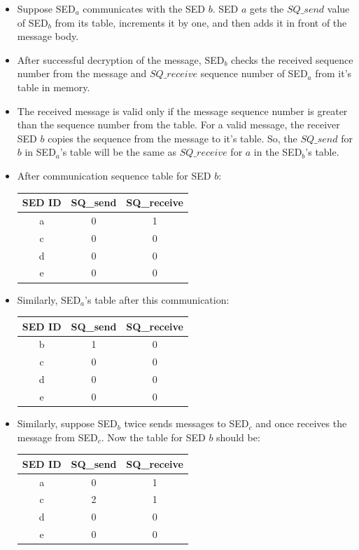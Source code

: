 \documentclass[11pt,oneside,onecolumn,letterpaper]{article}
\begin{document}
\begin{itemize}
  \item Suppose SED$_a$ communicates with the SED $b$. SED $a$ gets the 
   $SQ\_send$ value of SED$_b$ from its table, increments it by one, and then adds it in front of the message body. 
  \item After successful decryption of the message, SED$_b$ checks the received sequence number from the message and $SQ\_receive$ sequence number of SED$_a$ from it's table in memory.
  \item The received message is valid only if the message sequence number is greater than the sequence number from the table. For a valid message, the receiver SED $b$ copies the sequence from the message to it's table. So, the  $SQ\_send$ for $b$ in SED$_a$'s table will be the same as $SQ\_receive$ for $a$ in the SED$_b$'s table.
  \item After communication sequence table for SED $b$:
    \begin{center}
  \begin{tabular}{ |c|c|c| } 
   \hline
  \textbf{SED ID} & \textbf{SQ\_send} & \textbf{SQ\_receive}\\
 	\hline \hline
 	a & 0 & 1 \\ 
	c & 0 & 0 \\ 
 	d & 0 & 0 \\ 
 	e & 0 & 0 \\ 
	 \hline
\end{tabular}
\end{center}
\item Similarly, SED$_a$'s table after this communication:
    \begin{center}
  \begin{tabular}{ |c|c|c| } 
   \hline
  \textbf{SED ID} & \textbf{SQ\_send} & \textbf{SQ\_receive}\\
 	\hline \hline
 	b & 1 & 0 \\ 
	c & 0 & 0 \\ 
 	d & 0 & 0 \\ 
 	e & 0 & 0 \\ 
	 \hline
\end{tabular}
\end{center}
\item Similarly, suppose SED$_b$ twice sends messages to SED$_c$ and once receives the message from SED$_c$. Now the table for SED $b$ should be:
    \begin{center}
  \begin{tabular}{ |c|c|c| } 
   \hline
  \textbf{SED ID} & \textbf{SQ\_send} & \textbf{SQ\_receive}\\
 	\hline \hline
 	a & 0 & 1 \\ 
	c & 2 & 1 \\ 
 	d & 0 & 0 \\ 
 	e & 0 & 0 \\ 
	 \hline
\end{tabular}
\end{center}
    \end{itemize}
\end{document}
